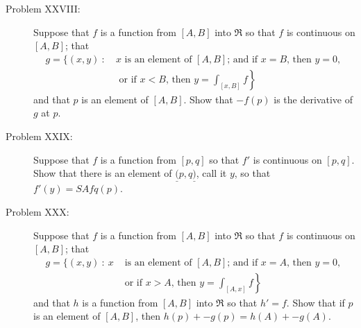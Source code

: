 \documentclass{article}
\begin{document}
\begin{description}
  \item[Problem XXVIII:] Suppose that $f$ is a function from $[A,B]$ into $\Re$ so that $f$ is continuous on $[A,B]$; that 
    \begin{align*}
    g = \{ (x,y)\ :\ & x \text{ is an element of $[A,B]$; and if $x=B$, then $y=0$, } \\
                     & \left. \text{ or if $x<B$, then } y = \int_{[x,B]} f \right\}
    \end{align*}
    and that $p$ is an element of $[A,B]$. Show that $-f(p)$ is the derivative of $g$ at $p$.

  \item[Problem XXIX:] Suppose that $f$ is a function from $[p,q]$ so that $f'$ is continuous on $[p,q]$. Show that there is an element of $\underline{(} p,q \underline{)}$, call it $y$, so that $f'(y) = SAfq(p)$.

  \item[Problem XXX:] Suppose that $f$ is a function from $[A,B]$ into $\Re$ so that $f$ is continuous on $[A,B]$; that 
    \begin{align*}
    g = \{ (x,y)\ :\ x & \text{ is an element of $[A,B]$; and if $x=A$, then $y=0$, } \\
                       & \left. \text{ or if $x>A$, then } y = \int_{[A,x]} f \right\}
    \end{align*}
    and that $h$ is a function from $[A,B]$ into $\Re$ so that $h' = f$. Show that if $p$ is an element of $[A,B]$, then $h(p) + -g(p) = h(A) + -g(A)$. 


\end{description}
\end{document}
